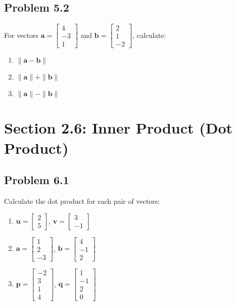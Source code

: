 \documentclass{article}
\begin{document}
\subsection{Problem 5.2}
For vectors $\mathbf{a} = \begin{bmatrix} 4 \\ -3 \\ 1 \end{bmatrix}$ and $\mathbf{b} = \begin{bmatrix} 2 \\ 1 \\ -2 \end{bmatrix}$, calculate:
\begin{enumerate}
\item $\|\mathbf{a} - \mathbf{b}\|$
\item $\|\mathbf{a}\| + \|\mathbf{b}\|$
\item $\|\mathbf{a}\| - \|\mathbf{b}\|$
\end{enumerate}

\section{Section 2.6: Inner Product (Dot Product)}

\subsection{Problem 6.1}
Calculate the dot product for each pair of vectors:
\begin{enumerate}
\item $\mathbf{u} = \begin{bmatrix} 2 \\ 5 \end{bmatrix}$, $\mathbf{v} = \begin{bmatrix} 3 \\ -1 \end{bmatrix}$
\item $\mathbf{a} = \begin{bmatrix} 1 \\ 2 \\ -3 \end{bmatrix}$, $\mathbf{b} = \begin{bmatrix} 4 \\ -1 \\ 2 \end{bmatrix}$
\item $\mathbf{p} = \begin{bmatrix} -2 \\ 3 \\ 1 \\ 4 \end{bmatrix}$, $\mathbf{q} = \begin{bmatrix} 1 \\ -1 \\ 2 \\ 0 \end{bmatrix}$
\end{enumerate}
\end{document}
